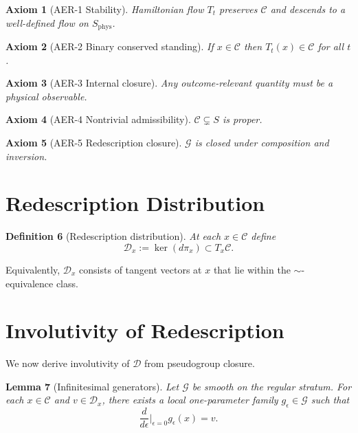 \documentclass[11pt]{article}
\newtheorem{definition}{Definition}[section]
\newtheorem{axiom}[definition]{Axiom}
\newtheorem{lemma}[definition]{Lemma}
\theoremstyle{remark}
\theoremstyle{plain}
\begin{document}
\begin{axiom}[AER-1 Stability]
Hamiltonian flow $T_t$ preserves $\mathcal{C}$ and descends to a well-defined flow on $S_{\mathrm{phys}}$.
\end{axiom}

\begin{axiom}[AER-2 Binary conserved standing]
If $x\in\mathcal{C}$ then $T_t(x)\in\mathcal{C}$ for all $t$.
\end{axiom}

\begin{axiom}[AER-3 Internal closure]
Any outcome-relevant quantity must be a physical observable.
\end{axiom}

\begin{axiom}[AER-4 Nontrivial admissibility]
$\mathcal{C}\subsetneq S$ is proper.
\end{axiom}

\begin{axiom}[AER-5 Redescription closure]
$\mathcal{G}$ is closed under composition and inversion.
\end{axiom}

\section{Redescription Distribution}

\begin{definition}[Redescription distribution]
At each $x\in\mathcal{C}$ define
\[
\mathcal{D}_x := \ker(d\pi_x) \subset T_x\mathcal{C}.
\]
\end{definition}

Equivalently, $\mathcal{D}_x$ consists of tangent vectors at $x$ that lie within the $\sim$-equivalence class.

\section{Involutivity of Redescription}

We now derive involutivity of $\mathcal{D}$ from pseudogroup closure.

\begin{lemma}[Infinitesimal generators]
Let $\mathcal{G}$ be smooth on the regular stratum.
For each $x\in\mathcal{C}$ and $v\in\mathcal{D}_x$,
there exists a local one-parameter family $g_\epsilon\in\mathcal{G}$
such that
\[
\frac{d}{d\epsilon}\Big|_{\epsilon=0} g_\epsilon(x) = v.
\]
\end{lemma}
\end{document}
